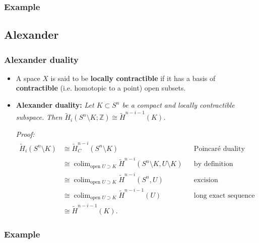 \documentclass[10pt]{article}
\newcommand{\zz}{\mathbb{Z}}
\newcommand{\reduced}[1]{\widetilde{#1}}
\DeclareMathOperator*{\colim}{colim}
\begin{document}
            \subsubsection{Example}


        \subsection{Alexander}

            \subsubsection{Alexander duality}

            \begin{itemize}
                \item A space $X$ is said to be \textbf{locally contractible} if it has a basis of \textbf{contractible} (i.e. homotopic to a point) open subsets.
                \item \textbf{Alexander duality:} \emph{Let $K\subset S^n$ be a compact and locally contractible subspace.}
                    \emph{Then $\reduced{H}_i(S^n\setminus K;\zz)\cong\reduced{H}^{n-i-1}(K)$.}

                    \emph{Proof:}
                        \begin{align*}
                            \reduced{H}_i(S^n\setminus K)&\cong \reduced{H}_C^{n-i}(S^n\setminus K) &&\text{Poincaré duality}\\
                            &\cong\colim_{\text{open }U\supset K}\reduced{H}^{n-i}(S^n\setminus K,U\setminus K) &&\text{by definition}\\
                            &\cong\colim_{\text{open }U\supset K}\reduced{H}^{n-i}(S^n,U) &&\text{excision}\\
                            &\cong\colim_{\text{open }U\supset K}\reduced{H}^{n-i-1}(U) &&\text{long exact sequence}\\
                            &\cong\reduced{H}^{n-i-1}(K).
                        \end{align*}
            \end{itemize}

            \subsubsection{Example}
\end{document}
